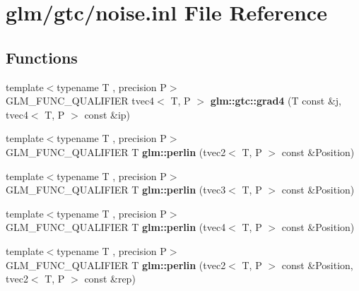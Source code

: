 \hypertarget{noise_8inl}{\section{glm/gtc/noise.inl File Reference}
\label{noise_8inl}
}
\subsection*{Functions}
\begin{DoxyCompactItemize}
\item 
\hypertarget{namespaceglm_1_1gtc_a5c4a3d973c67fd78ab6bc8f993d172ac}{{\footnotesize template$<$typename T , precision P$>$ }\\G\-L\-M\-\_\-\-F\-U\-N\-C\-\_\-\-Q\-U\-A\-L\-I\-F\-I\-E\-R tvec4$<$ T, P $>$ {\bfseries glm\-::gtc\-::grad4} (T const \&j, tvec4$<$ T, P $>$ const \&ip)}\label{namespaceglm_1_1gtc_a5c4a3d973c67fd78ab6bc8f993d172ac}

\item 
\hypertarget{namespaceglm_a911cdd6eb03df468ebd2b6f17ea43a3f}{{\footnotesize template$<$typename T , precision P$>$ }\\G\-L\-M\-\_\-\-F\-U\-N\-C\-\_\-\-Q\-U\-A\-L\-I\-F\-I\-E\-R T {\bfseries glm\-::perlin} (tvec2$<$ T, P $>$ const \&Position)}\label{namespaceglm_a911cdd6eb03df468ebd2b6f17ea43a3f}

\item 
\hypertarget{namespaceglm_a86c5aa2c23b2d0f62d3399ac024bc089}{{\footnotesize template$<$typename T , precision P$>$ }\\G\-L\-M\-\_\-\-F\-U\-N\-C\-\_\-\-Q\-U\-A\-L\-I\-F\-I\-E\-R T {\bfseries glm\-::perlin} (tvec3$<$ T, P $>$ const \&Position)}\label{namespaceglm_a86c5aa2c23b2d0f62d3399ac024bc089}

\item 
\hypertarget{namespaceglm_accc072c37eff6ab426b7138d0bd1765f}{{\footnotesize template$<$typename T , precision P$>$ }\\G\-L\-M\-\_\-\-F\-U\-N\-C\-\_\-\-Q\-U\-A\-L\-I\-F\-I\-E\-R T {\bfseries glm\-::perlin} (tvec4$<$ T, P $>$ const \&Position)}\label{namespaceglm_accc072c37eff6ab426b7138d0bd1765f}

\item 
\hypertarget{namespaceglm_aa51d7040ecd2773574a520a4bd41f680}{{\footnotesize template$<$typename T , precision P$>$ }\\G\-L\-M\-\_\-\-F\-U\-N\-C\-\_\-\-Q\-U\-A\-L\-I\-F\-I\-E\-R T {\bfseries glm\-::perlin} (tvec2$<$ T, P $>$ const \&Position, tvec2$<$ T, P $>$ const \&rep)}\label{namespaceglm_aa51d7040ecd2773574a520a4bd41f680}


\end{DoxyCompactItemize}
